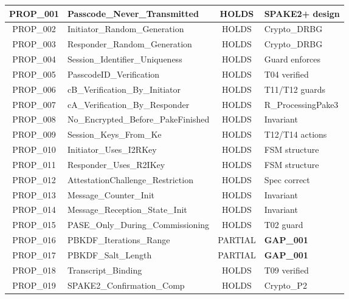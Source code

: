 \documentclass[11pt,a4paper]{article}
\begin{document}
\begin{longtable}{|c|l|c|l|}
PROP\_001 & Passcode\_Never\_Transmitted & \textcolor{successgreen}{HOLDS} & SPAKE2+ design \\
\hline
PROP\_002 & Initiator\_Random\_Generation & \textcolor{successgreen}{HOLDS} & Crypto\_DRBG \\
\hline
PROP\_003 & Responder\_Random\_Generation & \textcolor{successgreen}{HOLDS} & Crypto\_DRBG \\
\hline
PROP\_004 & Session\_Identifier\_Uniqueness & \textcolor{successgreen}{HOLDS} & Guard enforces \\
\hline
PROP\_005 & PasscodeID\_Verification & \textcolor{successgreen}{HOLDS} & T04 verified \\
\hline
PROP\_006 & cB\_Verification\_By\_Initiator & \textcolor{successgreen}{HOLDS} & T11/T12 guards \\
\hline
PROP\_007 & cA\_Verification\_By\_Responder & \textcolor{successgreen}{HOLDS} & R\_ProcessingPake3 \\
\hline
PROP\_008 & No\_Encrypted\_Before\_PakeFinished & \textcolor{successgreen}{HOLDS} & Invariant \\
\hline
PROP\_009 & Session\_Keys\_From\_Ke & \textcolor{successgreen}{HOLDS} & T12/T14 actions \\
\hline
PROP\_010 & Initiator\_Uses\_I2RKey & \textcolor{successgreen}{HOLDS} & FSM structure \\
\hline
PROP\_011 & Responder\_Uses\_R2IKey & \textcolor{successgreen}{HOLDS} & FSM structure \\
\hline
PROP\_012 & AttestationChallenge\_Restriction & \textcolor{successgreen}{HOLDS} & Spec correct \\
\hline
PROP\_013 & Message\_Counter\_Init & \textcolor{successgreen}{HOLDS} & Invariant \\
\hline
PROP\_014 & Message\_Reception\_State\_Init & \textcolor{successgreen}{HOLDS} & Invariant \\
\hline
PROP\_015 & PASE\_Only\_During\_Commissioning & \textcolor{successgreen}{HOLDS} & T02 guard \\
\hline
\rowcolor{gapyellow!20}
PROP\_016 & PBKDF\_Iterations\_Range & \textcolor{warningorange}{PARTIAL} & \textbf{GAP\_001} \\
\hline
\rowcolor{gapyellow!20}
PROP\_017 & PBKDF\_Salt\_Length & \textcolor{warningorange}{PARTIAL} & \textbf{GAP\_001} \\
\hline
PROP\_018 & Transcript\_Binding & \textcolor{successgreen}{HOLDS} & T09 verified \\
\hline
PROP\_019 & SPAKE2\_Confirmation\_Comp & \textcolor{successgreen}{HOLDS} & Crypto\_P2 \\

\end{longtable}
\end{document}
